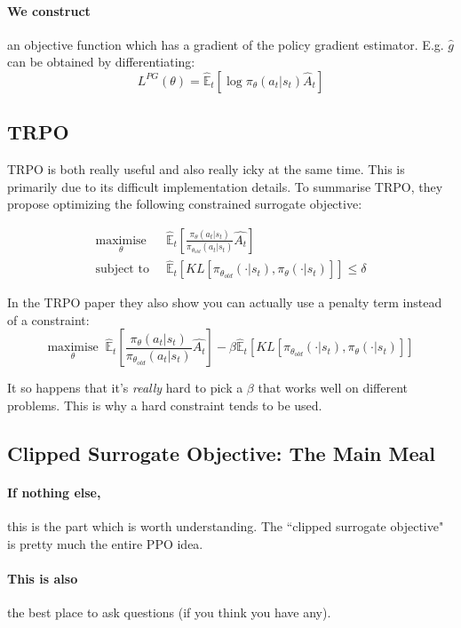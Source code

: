 \documentclass{article}
\begin{document}
\paragraph{We construct} an objective function which has a gradient of the policy gradient estimator. E.g. \(\hat{g}\) can be obtained by differentiating:
\[L^{PG} (\theta) = \hat{\mathbb{E}}_t \left [ \log\pi_\theta (a_t | s_t) \hat{A}_t \right] \]

\subsection{TRPO}

TRPO is both really useful and also really icky at the same time. This is primarily due to its difficult implementation details. To summarise TRPO, they propose optimizing the following constrained surrogate objective:

\begin{align*}
    \underset{\theta}{\text{maximise}} \;\; &\hat{\mathbb{E}}_{t} \left [ \frac{{\pi_\theta} (a_t|s_t)}{{\pi_{\theta_{old}}} (a_t|s_t)} \hat{A_t} \right] \\
    \text{subject to} \;\; &\hat{\mathbb{E}}_{t} \left [ KL \left[  \pi_{\theta_{old}} (\cdot|s_t), \pi_{\theta} (\cdot|s_t)\right] \right] \le \delta
\end{align*}

In the TRPO paper they also show you can actually use a penalty term instead of a constraint:
\[
    \underset{\theta}{\text{maximise}} \;\; \hat{\mathbb{E}}_{t} \left [ \frac{{\pi_\theta} (a_t|s_t)}{{\pi_{\theta_{old}}} (a_t|s_t)} \hat{A_t} \right] - \beta \hat{\mathbb{E}}_{t} \left [ KL \left[  \pi_{\theta_{old}} (\cdot|s_t), \pi_{\theta} (\cdot|s_t)\right] \right]
\]

It so happens that it's \emph{really} hard to pick a \(\beta\) that works well on different problems. This is why a hard constraint tends to be used. 

\subsection{Clipped Surrogate Objective: The Main Meal}
\paragraph{If nothing else,} this is the part which is worth understanding. The ``clipped surrogate objective" is pretty much the entire PPO idea.
\paragraph{This is also} the best place to ask questions (if you think you have any).
\end{document}
